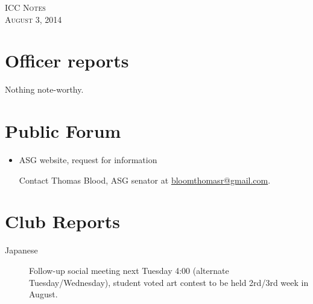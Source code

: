 \documentclass{article}
\begin{document}
\begin{center}
{\Large\scshape ICC Notes}\\[0.2cm]
{\large\scshape August 3, 2014}\\[0.4cm]
\end{center}

\section{Officer reports}
Nothing note-worthy.

\section{Public Forum}
\begin{itemize}
    \item ASG website, request for information

        Contact Thomas Blood, ASG senator at \url{bloomthomasr@gmail.com}.
\end{itemize}

\section{Club Reports}
\begin{description}
    \item[Japanese] Follow-up social meeting next Tuesday 4:00 (alternate Tuesday/Wednesday), student voted art contest to be held 2rd/3rd week in August.
\end{description}
\end{document}
